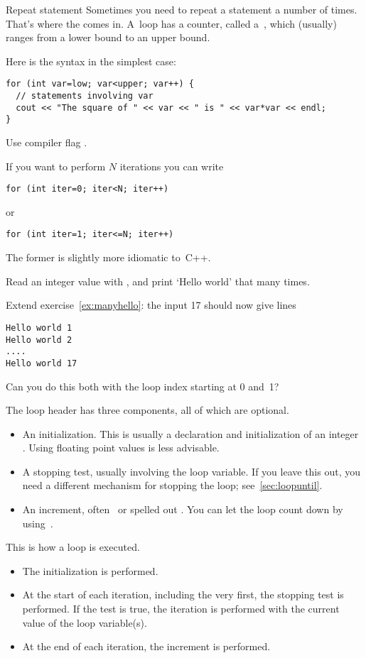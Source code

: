 \begin{slide}{Repeat statement}
  \label{sl:for}
  Sometimes you need to repeat a statement a number of times. That's
  where the  comes in. A~loop has a counter, called
  a~, which (usually) ranges from a lower bound
  to an upper bound.

  Here is the syntax in the simplest case:
\begin{verbatim}
for (int var=low; var<upper; var++) {
  // statements involving var
  cout << "The square of " << var << " is " << var*var << endl;
}
\end{verbatim}
\begin{cnote}
Use compiler flag .
\end{cnote}
\end{slide}

If you want to perform $N$ iterations you can write
\begin{verbatim}
for (int iter=0; iter<N; iter++)
\end{verbatim}
or
\begin{verbatim}
for (int iter=1; iter<=N; iter++)
\end{verbatim}
The former is slightly more idiomatic to~C++.

\begin{exercise}
  \label{ex:manyhello}
  Read an integer value with , and print `Hello world' that many times.
\end{exercise}
\begin{exercise}
  \label{ex:counthello}
  Extend exercise~\ref{ex:manyhello}: the input 17 should now give lines
\begin{verbatim}
Hello world 1
Hello world 2
....
Hello world 17
\end{verbatim}
Can you do this both with the loop index starting at 0 and~1?\\
\end{exercise}

The loop header has three components, all of which are optional.
\begin{itemize}
\item An initialization. This is usually a declaration and
  initialization of an integer . Using
  floating point values is less advisable.
\item A stopping test, usually
  involving the loop variable. If you leave this out, you need a
  different mechanism for stopping the loop; see~\ref{sec:loopuntil}.
\item An increment, often~ or spelled out . You can let the loop count down by using~.
\end{itemize}
This is how a loop is executed.
\begin{itemize}
\item The initialization is performed.
\item At the start of each iteration, including the very first, the
  stopping test is performed. If the test is true, the iteration is
  performed with the current value of the loop variable(s).
\item At the end of each iteration, the increment is performed.
\end{itemize}

